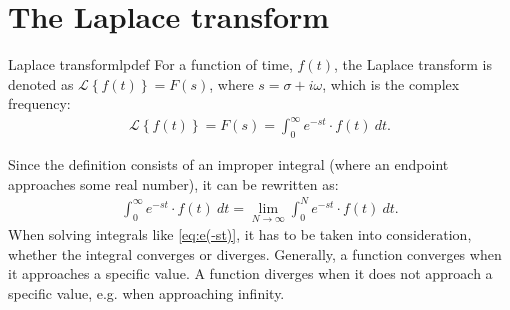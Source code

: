 \section{The Laplace transform}
\begin{definition}{Laplace transform}{lpdef}
For a function of time, $f(t)$, the Laplace transform is denoted as $\mathcal{L}\left\{ f(t)\right\} = F(s)$, where $s = \sigma + i\omega$, which is the complex frequency:
\begin{align}
\mathcal{L} \left\{f(t) \right\}=F(s)=\int_{0}^{\infty} e^{-st}\cdot f(t)\ dt.
\end{align}
\end{definition}
\noindent Since the definition consists of an improper integral (where an endpoint approaches some real number), it can be rewritten as:
\begin{align}
\int_{0}^{\infty} e^{-st}\cdot f(t)\ dt = \lim_{N \to \infty} \int_{0}^{N} e^{-st}\cdot f(t)\ dt. \label{eq:e(-st)}
\end{align}
When solving integrals like \eqref{eq:e(-st)}, it has to be taken into consideration, whether the integral converges or diverges. Generally, a function converges when it approaches a specific value. A function diverges when it does not approach a specific value, e.g. when approaching infinity.

